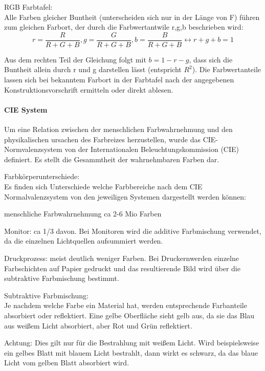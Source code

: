 \documentclass[landscape]{article}
\begin{document}
\begin{multicols}{3}
  RGB Farbtafel:\\
  Alle Farben gleicher Buntheit (unterscheiden sich nur in der Länge von F) führen zum gleichen Farbort, der durch die Farbwertantwile r,g,b beschrieben wird:
  $$r=\frac{R}{R+G+B}, g=\frac{G}{R+G+B}, b=\frac{B}{R+G+B} \leftrightarrow r+g+b=1$$
  
  Aus dem rechten Teil der Gleichung folgt mit $b=1-r-g$, dass sich die Buntheit allein durch r und g darstellen lässt (entspricht $R^2$).
  Die Farbwertanteile lassen sich bei bekanntem Farbort in der Farbtafel nach der angegebenen Konstruktionsvorschrift ermitteln oder direkt ablesen.
  
  
  \paragraph{CIE System}
  Um eine Relation zwischen der menschlichen Farbwahrnehmung und den physikalischen ursachen des Farbreizes herzustellen, wurde das CIE-Normvalenzsystem von der Internationalen Beleuchtungskommission (CIE) definiert. Es stellt die Gesammtheit der wahrnehmbaren Farben dar.
  
  Farbkörperunterschiede:\\
  Es finden sich Unterschiede welche Farbbereiche nach dem CIE Normalvalenzsystem von den jeweiligen Systemen dargestellt werden können:
  \begin{itemize*}
    \item menschliche Farbwahrnehmung ca 2-6 Mio Farben
    \item Monitor: ca 1/3 davon. Bei Monitoren wird die additive Farbmischung verwendet, da die einzelnen Lichtquellen aufsummiert werden.
    \item Druckprozess: meist deutlich weniger Farben. Bei Druckernwerden einzelne Farbschichten auf Papier gedruckt und das resultierende Bild wird über die subtraktive Farbmischung bestimmt.
  \end{itemize*}
  
  Subtraktive Farbmischung:\\
  Je nachdem welche Farbe ein Material hat, werden entsprechende Farbanteile absorbiert oder reflektiert. Eine gelbe Oberfläche sieht gelb aus, da sie das Blau aus weißem Licht absorbiert, aber Rot und Grün reflektiert.
  
  Achtung: Dies gilt nur für die Bestrahlung mit weißem Licht. Wird beispielsweise ein gelbes Blatt mit blauem Licht bestrahlt, dann wirkt es schwarz, da das blaue Licht vom gelben Blatt absorbiert wird.
  

\end{multicols}
\end{document}
